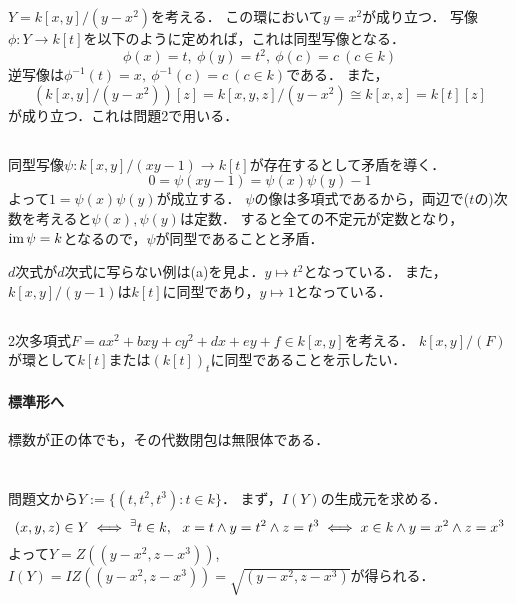 \documentclass[a4paper]{jarticle}
\begin{document}
\section{}
    \subsection{}
    $Y=k[x,y]/(y-x^2)$を考える．
    この環において$y=x^2$が成り立つ．
    写像$\phi: Y \to k[t]$を以下のように定めれば，これは同型写像となる．
    \[ \phi(x)=t,~ \phi(y)=t^2,~ \phi(c)=c ~(c \in k) \]
    逆写像は$\phi^{-1}(t)=x,~ \phi^{-1}(c)=c ~(c \in k)$である．
    また，
    \[ (k[x,y]/(y-x^2))[z]=k[x,y,z]/(y-x^2) \cong k[x,z]=k[t][z] \]
    が成り立つ．これは問題2で用いる．

    \subsection{}
    同型写像$\psi: k[x,y]/(xy-1) \to k[t]$が存在するとして矛盾を導く．
    \[ 0=\psi(xy-1)=\psi(x)\psi(y)-1 \]
    よって$1=\psi(x)\psi(y)$が成立する．
    $\psi$の像は多項式であるから，両辺で($t$の)次数を考えると$\psi(x), \psi(y)$は定数．
    すると全ての不定元が定数となり，$\operatorname{im} \psi=k$となるので，$\psi$が同型であることと矛盾．

    \begin{Remark}
    $d$次式が$d$次式に写らない例は(a)を見よ．$y \mapsto t^2$となっている．
    また，$k[x,y]/(y-1)$は$k[t]$に同型であり，$y \mapsto 1$となっている．
    \end{Remark}

    \subsection{}
    2次多項式$F=ax^2+bxy+cy^2+dx+ey+f \in k[x,y]$を考える．
    $k[x,y]/(F)$が環として$k[t]$または$(k[t])_{t}$に同型であることを示したい．

    \paragraph{標準形へ}
    標数が正の体でも，その代数閉包は無限体である．

\section{}
    問題文から$Y:=\{ (t,t^2,t^3) : t \in k\}$．
    まず，$I(Y)$の生成元を求める．
    \[ (x,y,z) \in Y \iff {}^{\exists} t \in k,~~ x=t \land y=t^2 \land z=t^3 \iff x \in k \land y=x^2 \land z=x^3 \]
    よって$Y=Z((y-x^2, z-x^3))$, $I(Y)=IZ((y-x^2, z-x^3))=\sqrt{(y-x^2, z-x^3)}$が得られる．
\end{document}
